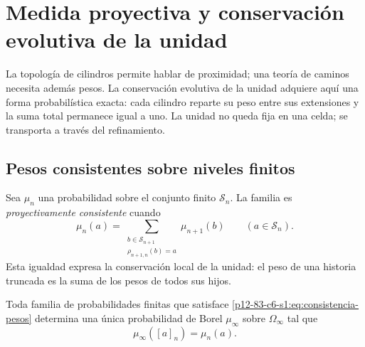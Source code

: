\label{chap:83-06}

\section{Medida proyectiva y conservación evolutiva de la unidad}
\label{p12-83-c6-s1:chap:medida-proyectiva}

La topología de cilindros permite hablar de proximidad; una teoría de caminos
necesita además pesos. La conservación evolutiva de la unidad adquiere aquí
una forma probabilística exacta: cada cilindro reparte su peso entre sus
extensiones y la suma total permanece igual a uno. La unidad no queda fija en
una celda; se transporta a través del refinamiento.

\subsection{Pesos consistentes sobre niveles finitos}

Sea \(\mu_n\) una probabilidad sobre el conjunto finito
\(\mathcal S_n\). La familia es \emph{proyectivamente consistente} cuando
\begin{equation}
 \mu_n(a)
 =\sum_{\substack{b\in\mathcal S_{n+1}\\
                   \rho_{n+1,n}(b)=a}}
   \mu_{n+1}(b)
 \qquad(a\in\mathcal S_n).
 \label{p12-83-c6-s1:eq:consistencia-pesos}
\end{equation}
Esta igualdad expresa la conservación local de la unidad: el peso de una
historia truncada es la suma de los pesos de todos sus hijos.

\begin{theorem}
\label{p12-83-c6-s1:thm:medida-genealogica}
Toda familia de probabilidades finitas que satisface
\eqref{p12-83-c6-s1:eq:consistencia-pesos} determina una única probabilidad de Borel
\(\mu_\infty\) sobre \(\Omega_\infty\) tal que
\begin{equation}
 \mu_\infty([a]_n)=\mu_n(a).
 \label{p12-83-c6-s1:eq:medida-cilindro}
\end{equation}
\end{theorem}

